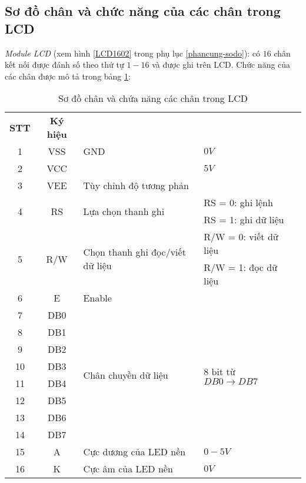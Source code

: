 \subsection{Sơ đồ chân và chức năng của các chân trong LCD}
\textit{Module LCD} (xem hình \ref{LCD1602} trong phụ lục \ref{phancung-sodo}): có $16$ chân kết nối được đánh số theo thứ tự $1 - 16$ và được ghi trên LCD. Chức năng của các chân được mô tả trong bảng \ref{cnLCD}:
\begin{table}[h]
\begin{center}
\begin{tabular}{|c|c|p{6.5cm}|p{5cm}|l}\cline{1-4}
\textbf{STT} & \textbf{Ký hiệu} & \centering{\textbf{Mô tả}} & \centering{\textbf{Giá trị}} &\\ \cline{1-4}
1 & VSS & GND & $0V$ &\\ \cline{1-4}
2 & VCC & & $5V$ &\\ \cline{1-4}
3 & VEE & Tùy chỉnh độ tương phản & &\\ \cline{1-4}
\multirow{2}{.5cm}{ 4} & \multirow{2}{.8cm}{RS} & \multirow{2}{5cm}{Lựa chọn thanh ghi} & RS = 0: ghi lệnh & \\
& & & RS = 1: ghi dữ liệu &\\ \cline{1-4}
\multirow{2}{.5cm}{ 5} & \multirow{2}{.8cm}{R/W} & \multirow{2}{7cm}{Chọn thanh ghi đọc/viết dữ liệu} & R/W = 0: viết dữ liệu & \\
& & & R/W = 1: đọc dữ liệu &\\ \cline{1-4}
6 & E & Enable & &\\ \cline{1-4}
7 & DB0 & \multirow{8}{5cm}{Chân chuyền dữ liệu} & \multirow{8}{5cm}{8 bit từ $DB0 \rightarrow DB7$} & \\ 
8 & DB1 &  & & \\ 
9 & DB2 &  & & \\ 
10 & DB3 &  & & \\ 
11 & DB4 &  & & \\ 
12 & DB5 &  & & \\ 
13 & DB6 &  & & \\ 
14 & DB7 &  & &\\ \cline{1-4}
15 & A & Cực dương của LED nền & $0 - 5V$&\\ \cline{1-4}
16 & K & Cực âm của LED nền & $0V$ &\\ \cline{1-4}
\end{tabular}
\end{center}
\caption{Sơ đồ chân và chứa năng các chân trong LCD} \label{cnLCD}
\end{table}

